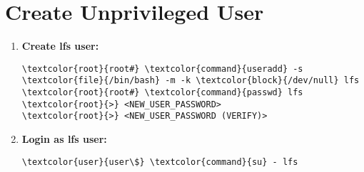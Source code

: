\documentclass[10pt, a4paper, onecolumn, oneside, titlepage, openany]{book}
\begin{document}
\section{Create Unprivileged User}
\begin{enumerate}
    \item \textbf{Create lfs user:}
\begin{Verbatim}[commandchars=\\\{\}]
\textcolor{root}{root#} \textcolor{command}{useradd} -s \textcolor{file}{/bin/bash} -m -k \textcolor{block}{/dev/null} lfs
\textcolor{root}{root#} \textcolor{command}{passwd} lfs
\textcolor{root}{>} <NEW_USER_PASSWORD>
\textcolor{root}{>} <NEW_USER_PASSWORD (VERIFY)>
\end{Verbatim}
    \item \textbf{Login as lfs user:}
\begin{Verbatim}[commandchars=\\\{\}]
\textcolor{user}{user\$} \textcolor{command}{su} - lfs
\end{Verbatim}
\end{enumerate}
\end{document}
